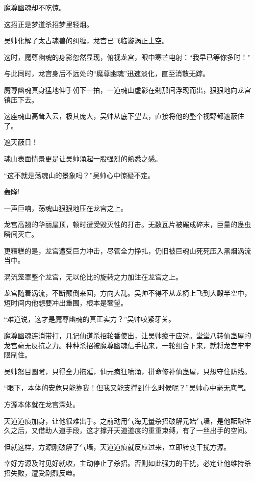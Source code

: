 \begin{this_body}
魔尊幽魂却不吃惊。

这招正是梦道杀招梦里轻烟。

吴帅化解了太古魂兽的纠缠，龙宫已飞临漩涡正上空。

这时，魔尊幽魂的身影忽然显现，俯视龙宫，眼中寒芒电射：“我早已等你多时！”

与此同时，龙宫身后不远处的“魔尊幽魂”迅速淡化，直至消散无踪。

魔尊幽魂真身猛地伸手朝下一拍，一道魂山虚影在刹那间浮现而出，狠狠地向龙宫镇压下去。

这座魂山高耸入云，极其庞大，吴帅从底下望去，直接将他的整个视野都遮蔽住了。

遮天蔽日！

魂山表面情景更是让吴帅涌起一股强烈的熟悉之感。

“这不就是荡魂山的景象吗？”吴帅心中惊疑不定。

轰隆!

一声巨响，荡魂山狠狠地压在龙宫之上。

龙宫高翘的华丽屋顶，顿时遭受毁灭性的打击。无数瓦片被碾成碎末，巨量的蛊虫瞬间灭亡。

更糟糕的是，龙宫遭受巨力冲击，尽管全力挣扎，仍旧被巨魂山死死压入黑烟涡流当中。

涡流笼罩整个龙宫，无以伦比的旋转之力加注在龙宫之上。

龙宫随着涡流，不断颠倒来回，方向大乱。吴帅不得不从龙椅上飞到大殿半空中，短时间内他想要冲出重围，根本是奢望。

“难道说，这才是魔尊幽魂的真正实力？”吴帅咬紧牙关。

魔尊幽魂连消带打，几记仙道杀招轮番使出，让吴帅疲于应对。堂堂八转仙蛊屋的龙宫毫无反抗之力。种种杀招被魔尊幽魂信手拈来，一轮组合下来，就将龙宫牢牢限制住。

吴帅怒目圆瞪，只得全力拖延，仙元疯狂喷涌，拼命修补仙蛊屋，只想守住防线。

“眼下，本体的安危只能靠我！但我又能支撑到什么时候呢？”吴帅心中毫无底气。

方源本体就在龙宫深处。

天道道痕加身，让他很难出手。之前动用气海无量杀招破解元始气墙，是他酝酿许久之后，又借助人道手段，这才撑开天道道痕的重重束缚，有了一丝出手的空间。

但就这样，方源刚破解了气墙，天道道痕就反应过来，立即转变干扰方源。

幸好方源及时见好就收，主动停止了杀招。否则如此强力的干扰，必定让他维持杀招失败，遭受剧烈反噬。


\end{this_body}
